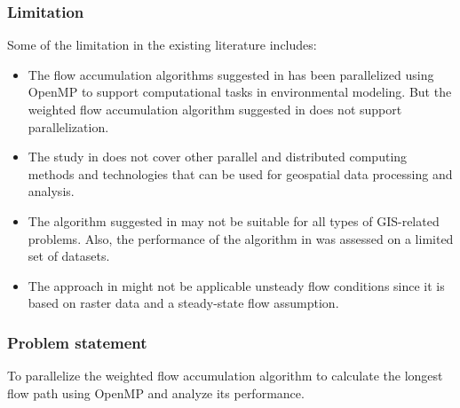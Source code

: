 \documentclass[]{beamer}
\begin{document}
	\begin{frame}
		\frametitle{Limitation}
		Some of the limitation in the existing literature includes:
		\begin{itemize}
		
			\item The flow accumulation algorithms suggested in \cite{KOTYRA2021104741, DEJONG2022105083, KOTYRA2023105728, HUANG2022106, KOTYRA2023105613, stojanovic2020accelerating} has been parallelized using OpenMP to support computational tasks in environmental modeling. But the weighted flow  accumulation algorithm suggested in \cite{CHO2020104774} does not support parallelization.
			
			\item The study in \cite{stojanovic2020accelerating} does not cover other parallel and distributed computing methods and technologies that can be used for geospatial data processing and analysis.
			
			\item The algorithm suggested in \cite{KOTYRA2023105613} may not be suitable for all types of GIS-related problems. Also, the performance of the algorithm in \cite{DEJONG2022105083, CHO2020104774} was assessed on a limited set of datasets. 
			
			\item The approach in \cite{KOTYRA2023105728} might not be applicable unsteady flow conditions since it is based on raster data and a steady-state flow assumption.
			
			
			
			
			
			
		\end{itemize}
	\end{frame}

	\begin{frame}
		\frametitle{Problem statement}
		
		
		To parallelize the weighted flow accumulation algorithm to calculate the longest flow path using OpenMP and analyze its performance.
		
		
		
		
	\end{frame}
	
\end{document}
